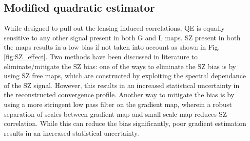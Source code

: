 \subsection{Modified quadratic estimator}
While designed to pull out the lensing induced correlations, QE is equally sensitive to any other signal present in both G and L maps.
 SZ present in both the maps results in a low bias if not taken into account as shown in Fig. \ref{fig:SZ_effect}.
 Two methods have been discussed in literature to eliminate/mitigate the SZ bias:
 one of the ways to eliminate the SZ bias is by using SZ free maps, which are constructed by exploiting the spectral dependance of the SZ signal.
 However, this results in an increased statistical uncertainty in the reconstructed convergence profile.
 Another way to mitigate the bias is by using a more stringent low pass filter on the gradient map, wherein a robust separation of scales between gradient map and small scale map reduces SZ correlation.
 While this can reduce the bias significantly,  poor gradient estimation results in an increased statistical uncertainty.

